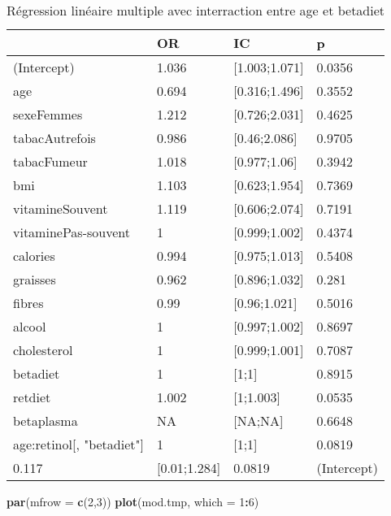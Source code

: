 \documentclass[]{article}
\newenvironment{Shaded}{\begin{snugshade}}{\end{snugshade}}
\newcommand{\KeywordTok}[1]{\textcolor[rgb]{0.13,0.29,0.53}{\textbf{#1}}}
\newcommand{\DataTypeTok}[1]{\textcolor[rgb]{0.13,0.29,0.53}{#1}}
\newcommand{\DecValTok}[1]{\textcolor[rgb]{0.00,0.00,0.81}{#1}}
\newcommand{\OperatorTok}[1]{\textcolor[rgb]{0.81,0.36,0.00}{\textbf{#1}}}
\newcommand{\NormalTok}[1]{#1}
\begin{document}
\begin{table}

\caption{\label{tab:unnamed-chunk-83}Régression linéaire multiple avec interraction entre age et betadiet}
\centering
\begin{tabular}[t]{l|l|l|l}
\hline
  & OR & IC & p\\
\hline
\rowcolor[HTML]{BBD2E1}  (Intercept) & 1.036 & [1.003;1.071] & 0.0356\\
\hline
age & 0.694 & [0.316;1.496] & 0.3552\\
\hline
\rowcolor[HTML]{BBD2E1}  sexeFemmes & 1.212 & [0.726;2.031] & 0.4625\\
\hline
tabacAutrefois & 0.986 & [0.46;2.086] & 0.9705\\
\hline
\rowcolor[HTML]{BBD2E1}  tabacFumeur & 1.018 & [0.977;1.06] & 0.3942\\
\hline
bmi & 1.103 & [0.623;1.954] & 0.7369\\
\hline
\rowcolor[HTML]{BBD2E1}  vitamineSouvent & 1.119 & [0.606;2.074] & 0.7191\\
\hline
vitaminePas-souvent & 1 & [0.999;1.002] & 0.4374\\
\hline
\rowcolor[HTML]{BBD2E1}  calories & 0.994 & [0.975;1.013] & 0.5408\\
\hline
graisses & 0.962 & [0.896;1.032] & 0.281\\
\hline
\rowcolor[HTML]{BBD2E1}  fibres & 0.99 & [0.96;1.021] & 0.5016\\
\hline
alcool & 1 & [0.997;1.002] & 0.8697\\
\hline
\rowcolor[HTML]{BBD2E1}  cholesterol & 1 & [0.999;1.001] & 0.7087\\
\hline
betadiet & 1 & [1;1] & 0.8915\\
\hline
\rowcolor[HTML]{BBD2E1}  retdiet & 1.002 & [1;1.003] & 0.0535\\
\hline
betaplasma & NA & [NA;NA] & 0.6648\\
\hline
\rowcolor[HTML]{BBD2E1}  age:retinol[, "betadiet"] & 1 & [1;1] & 0.0819\\
\hline
0.117 & [0.01;1.284] & 0.0819 & (Intercept)\\
\hline
\end{tabular}
\end{table}

\begin{Shaded}
\begin{Highlighting}[]
\KeywordTok{par}\NormalTok{(}\DataTypeTok{mfrow =} \KeywordTok{c}\NormalTok{(}\DecValTok{2}\NormalTok{,}\DecValTok{3}\NormalTok{))}
\KeywordTok{plot}\NormalTok{(mod.tmp, }\DataTypeTok{which =} \DecValTok{1}\OperatorTok{:}\DecValTok{6}\NormalTok{)}
\end{Highlighting}
\end{Shaded}
\end{document}
